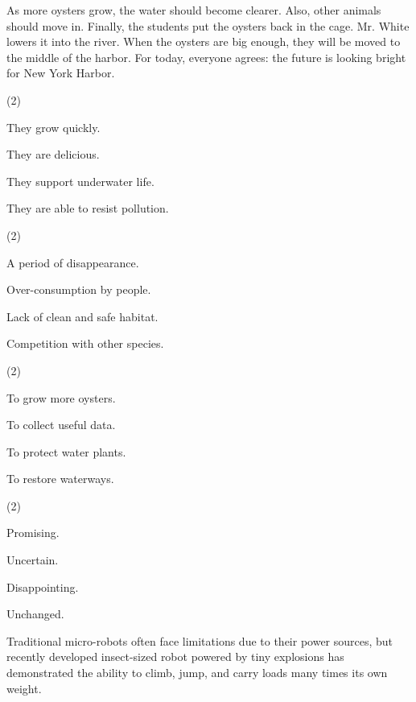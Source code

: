 \documentclass{英语试卷}
\begin{document}
\par As more oysters grow, the water should become clearer. Also, other animals should move in. Finally, the students put the oysters back in the cage. Mr. White lowers it into the river. When the oysters are big enough, they will be moved to the middle of the harbor. For today, everyone agrees: the future is looking bright for New York Harbor.\par
{}
\begin{choices}(2)
  \item They grow quickly.
  \item They are delicious.
  \item They support underwater life.
  \item They are able to resist pollution.
\end{choices}
\begin{choices}(2)
  \item A period of disappearance.
  \item Over-consumption by people.
  \item Lack of clean and safe habitat.
  \item Competition with other species.
\end{choices}
\begin{choices}(2)
  \item To grow more oysters.
  \item To collect useful data.
  \item To protect water plants.
  \item To restore waterways.
\end{choices}
\begin{choices}(2)
  \item Promising.
  \item Uncertain.
  \item Disappointing.
  \item Unchanged.
\end{choices}
\par Traditional micro-robots often face limitations due to their power sources, but recently developed insect-sized robot powered by tiny explosions has demonstrated the ability to climb, jump, and carry loads many times its own weight.\par
\end{document}
